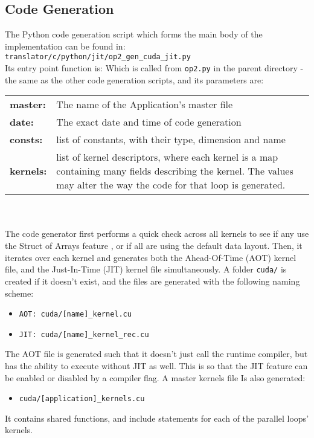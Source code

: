 \subsection{Code Generation}
\label{ss:codegen}
The Python code generation script which forms the main body of the implementation can be found in: \verb|translator/c/python/jit/op2_gen_cuda_jit.py|
\\
Its entry point function is:
Which is called from \verb|op2.py| in the parent directory - the same as the other code generation scripts, and its parameters are:\\
\begin{tabular}{>{\bfseries}l l}
  master: & The name of the Application's master file \\
  date: & The exact date and time of code generation \\
  consts: & list of constants, with their type, dimension and name \\
  kernels: & \parbox[t]{.8\textwidth}{list of kernel descriptors, where each kernel is a map containing many fields describing the kernel. The values may alter the way the code for that loop is generated.}
\end{tabular}
\\
\\
The code generator first performs a quick check across all kernels to see if any use the Struct of Arrays feature \cite[p13]{manual}, or if all are using the default data layout. Then, it iterates over each kernel and generates both the Ahead-Of-Time (AOT) kernel file, and the Just-In-Time (JIT) kernel file simultaneously. A folder \verb|cuda/| is created if it doesn't exist, and the files are generated with the following naming scheme:
\begin{itemize}
\vspace{-1em}
\item{\verb|AOT: cuda/[name]_kernel.cu|}
\vspace{-1em}
\item{\verb|JIT: cuda/[name]_kernel_rec.cu|}
\end{itemize}
The AOT file is generated such that it doesn't just call the runtime compiler, but has the ability to execute without JIT as well. This is so that the JIT feature can be enabled or disabled by a compiler flag. A master kernels file Is also generated:
\begin{itemize}
\vspace{-1em}
\item{\verb|cuda/[application]_kernels.cu|}
\end{itemize}
It contains shared functions, and include statements for each of the parallel loops' kernels.

